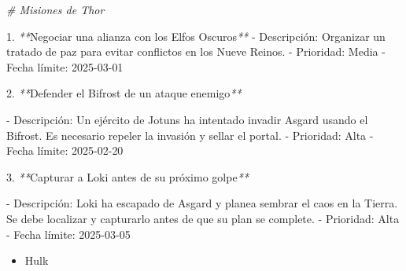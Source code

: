 \documentclass[
]{book}
\newenvironment{Shaded}{\begin{snugshade}}{\end{snugshade}}
\newcommand{\CommentTok}[1]{\textcolor[rgb]{0.56,0.35,0.01}{\textit{#1}}}
\newcommand{\ExtensionTok}[1]{#1}
\newcommand{\NormalTok}[1]{#1}
\newcommand{\PreprocessorTok}[1]{\textcolor[rgb]{0.56,0.35,0.01}{\textit{#1}}}
\providecommand{\tightlist}{%
  \setlength{\itemsep}{0pt}\setlength{\parskip}{0pt}}
\begin{document}
\begin{Shaded}
\begin{Highlighting}[]
\CommentTok{\# Misiones de Thor}

\ExtensionTok{1.} \PreprocessorTok{**}\NormalTok{Negociar una alianza con los Elfos Oscuros}\PreprocessorTok{**}
   \ExtensionTok{{-}}\NormalTok{ Descripción: Organizar un tratado de paz para evitar conflictos en los Nueve Reinos.}
   \ExtensionTok{{-}}\NormalTok{ Prioridad: Media}
   \ExtensionTok{{-}}\NormalTok{ Fecha límite: 2025{-}03{-}01}

\ExtensionTok{2.} \PreprocessorTok{**}\NormalTok{Defender el Bifrost de un ataque enemigo}\PreprocessorTok{**}

   \ExtensionTok{{-}}\NormalTok{ Descripción: Un ejército de Jotuns ha intentado invadir Asgard usando el Bifrost. Es necesario repeler la invasión y sellar el portal.}
   \ExtensionTok{{-}}\NormalTok{ Prioridad: Alta}
   \ExtensionTok{{-}}\NormalTok{ Fecha límite: 2025{-}02{-}20}

\ExtensionTok{3.} \PreprocessorTok{**}\NormalTok{Capturar a Loki antes de su próximo golpe}\PreprocessorTok{**}

   \ExtensionTok{{-}}\NormalTok{ Descripción: Loki ha escapado de Asgard y planea sembrar el caos en la Tierra. Se debe localizar y capturarlo antes de que su plan se complete.}
   \ExtensionTok{{-}}\NormalTok{ Prioridad: Alta}
   \ExtensionTok{{-}}\NormalTok{ Fecha límite: 2025{-}03{-}05}
\end{Highlighting}
\end{Shaded}

\begin{itemize}
\tightlist
\item
  Hulk
\end{itemize}
\end{document}
